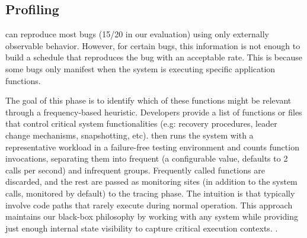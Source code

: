 

\subsection{Profiling}
\label{sec:profiling}

\sys can reproduce most bugs (15/20 in our evaluation) using only externally observable behavior.
However, for certain bugs, this information is not enough to build a schedule that reproduces the bug with an acceptable rate.
This is because some bugs only manifest when the system is executing specific application functions.

The goal of this phase is to identify which of these functions might be relevant through a frequency-based heuristic.
Developers provide a list of functions or files that control critical system functionalities (e.g: recovery procedures, leader change mechanisms, snapshotting, etc).
\sys then runs the system with a representative workload in a failure-free testing environment and counts function invocations, separating them into frequent (a configurable value, defaults to 2 calls per second) and infrequent groups.
Frequently called functions are discarded, and the rest are passed as monitoring sites (in addition to the system calls, monitored by default) to the tracing phase.
The intuition is that \efibshort typically involve code paths that rarely execute during normal operation.
This approach maintains our black-box philosophy by working with any system while providing just enough internal state visibility to capture critical execution contexts.
.

